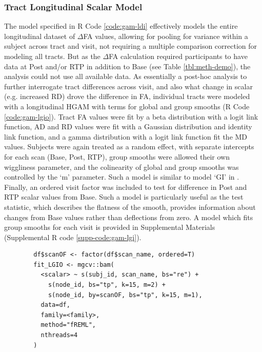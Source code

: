 \documentclass[12pt]{article}
\begin{document}
\subsubsection{Tract Longitudinal Scalar Model}
\label{sssec:meth-gam-lgio}
The model specified in R Code \ref{code:gam-ldi} effectively models the entire longitudinal dataset of $\Delta$FA values, allowing for pooling for variance within a subject across tract and visit, not requiring a multiple comparison correction for modeling all tracts. But as the $\Delta$FA calculation required participants to have data at Post and/or RTP in addition to Base (see Table \ref{tbl:meth-demo}), the analysis could not use all available data. As essentially a post-hoc analysis to further interrogate tract differences across visit, and also what change in scalar (e.g. increased RD) drove the difference in FA, individual tracts were modeled with a longitudinal HGAM with terms for global and group smooths (R Code \ref{code:gam-lgio}). Tract FA values were fit by a beta distribution with a logit link function, AD and RD values were fit with a Gaussian distribution and identity link function, and a gamma distribution with a logit link function fit the MD values. Subjects were again treated as a random effect, with separate intercepts for each scan (Base, Post, RTP), group smooths were allowed their own wiggliness parameter, and the colinearity of global and group smooths was controlled by the `m' parameter. Such a model is similar to model `GI' in \textcite{pedersen2019HierarchicalGeneralizedAdditive}. Finally, an ordered visit factor was included to test for difference in Post and RTP scalar values from Base. Such a model is particularly useful as the test statistic, which describes the flatness of the smooth, provides information about changes from Base values rather than deflections from zero. A model which fits group smooths for each visit is provided in Supplemental Materials (Supplemental R code \ref{supp-code:gam-lgi}).

\begin{equ}[H]
	\begin{lstlisting}
		df$scanOF <- factor(df$scan_name, ordered=T)
		fit_LGIO <- mgcv::bam(
		  <scalar> ~ s(subj_id, scan_name, bs="re") +
		    s(node_id, bs="tp", k=15, m=2) +
		    s(node_id, by=scanOF, bs="tp", k=15, m=1),
		  data=df,
		  family=<family>,
		  method="fREML",
		  nthreads=4
		)
	\end{lstlisting}
	\caption{Tract scalars are modeled as a function of tract node with thin-plate regression splines using both global and group (\lstinline{scan_name}) smooths as well as individual group wiggliness. An ordered factor of scan visit was used to compare Post and RTP to Base. \lstinline{<scalar>} = relevant DWI metric (AD, RD, MD, or FA), \lstinline{scan_name} = visit identifier factor (Base, Post, RTP), \lstinline{scanOF} = ordered factor of \lstinline{scan_name}, \lstinline{<family>} = relevant family and link function for scalar distribution.}
	\label{code:gam-lgio}
\end{equ}
\end{document}
